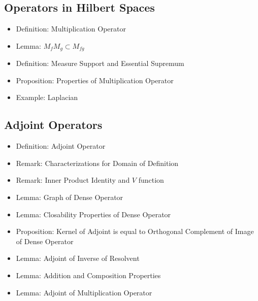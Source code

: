 \documentclass[8pt,twocolumn]{article}
\begin{document}
    \subsection{Operators in Hilbert Spaces} %
    \label{sub:operators_in_hilbert_spaces}
      \begin{itemize}
        \item Definition: Multiplication Operator
        \item Lemma: $M_fM_g \subset M_{fg}$
        \item Definition: Measure Support and Essential Supremum
        \item Proposition: Properties of Multiplication Operator
        \item Example: Laplacian
      \end{itemize}

    \subsection{Adjoint Operators} %
    \label{sub:selfadjoint_operators}
      \begin{itemize}
        \item Definition: Adjoint Operator
        \item Remark: Characterizations for Domain of Definition
        \item Remark: Inner Product Identity and $V$ function
        \item Lemma: Graph of Dense Operator
        \item Lemma: Closability Properties of Dense Operator
        \item Proposition: Kernel of Adjoint is equal to Orthogonal Complement of Image of Dense Operator
        \item Lemma: Adjoint of Inverse of Resolvent
        \item Lemma: Addition and Composition Properties
        \item Lemma: Adjoint of Multiplication Operator
      \end{itemize}
\end{document}
